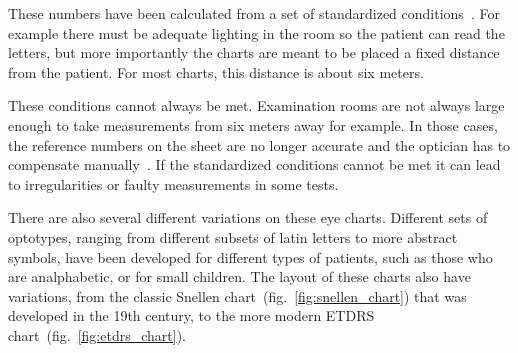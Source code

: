 \documentclass[12pt,a4paper,notitlepage]{report}
\begin{document}

These numbers have been calculated from a set of standardized conditions~\cite{Bailey}. For example there must be adequate lighting in the room so the patient can read the letters, but more importantly the charts are meant to be placed a fixed distance from the patient. For most charts, this distance is about six meters. %

These conditions cannot always be met. Examination rooms are not always large enough to take measurements from six meters away for example. In those cases, the reference numbers on the sheet are no longer accurate and the optician has to compensate manually~\cite{PGSoderberg}. If the standardized conditions cannot be met it can lead to irregularities or faulty measurements in some tests.


There are also several different variations on these eye charts. Different sets of optotypes, ranging from different subsets of latin letters to more abstract symbols, have been developed for different types of patients, such as those who are analphabetic, or for small children. The layout of these charts also have variations, from the classic Snellen chart~(fig.~\ref{fig:snellen_chart}) that was developed in the 19th century, to the more modern ETDRS chart~(fig.~\ref{fig:etdrs_chart}).

\end{document}
